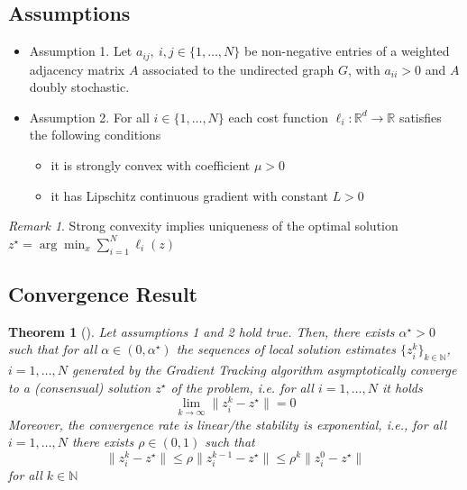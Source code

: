 \documentclass{book}
\newcommand{\R}{\mathbb{R}}
\newcommand{\N}{\mathbb{N}}
\theoremstyle{theoremv2}
\newtheorem{theorem}{Theorem}[chapter]
\theoremstyle{defv2}
\theoremstyle{remark}
\newtheorem*{remark}{Remark}
\theoremstyle{remark}
\theoremstyle{definition}
\theoremstyle{definition}
\begin{document}
\subsection{Assumptions}
\begin{itemize}
    \item Assumption 1. Let $a_{ij},\ i,j\in\{1,\dots,N\}$ be non-negative entries of a weighted adjacency matrix $A$ associated to the undirected graph $G$, with $a_{ii}>0$ and $A$ doubly stochastic.
    \item Assumption 2. For all $i\in\{1,\dots,N\}$ each cost function $\ell_i:\R^d\to\R$ satisfies the following conditions
        \begin{itemize}
            \item it is strongly convex with coefficient $\mu>0$
            \item it has Lipschitz continuous gradient with constant $L>0$
        \end{itemize}
\end{itemize}
\begin{remark}
    Strong convexity implies uniqueness of the optimal solution $z^\star = \arg\min_x \displaystyle\sum_{i=1}^{N} \ell_i(z)$
\end{remark}
\subsection{Convergence Result}
\begin{theorem}[]
    Let assumptions 1 and 2 hold true. Then, there exists $\alpha^\star>0$ such that for all $\alpha\in(0,\alpha^\star)$ the sequences of local solution estimates $\{z_i^k\}_{k\in\N}$, $i=1,\dots,N$ generated by the Gradient Tracking algorithm asymptotically converge to a (consensual) solution $z^\star$ of the problem, i.e. for all $i=1,\dots,N$ it holds
    \[
        \lim_{k\to\infty} \|z_i^k-z^\star\| = 0
    \]
    Moreover, the convergence rate is linear/the stability is exponential, i.e., for all $i=1,\dots,N$ there exists $\rho\in(0,1)$ such that 
    \[
        \|z_i^k-z^\star\| \leq \rho \|z_i^{k-1}-z^\star\| \leq \rho^k \|z_i^0-z^\star\|
    \]
    for all $k\in\N$
\end{theorem}
\end{document}
